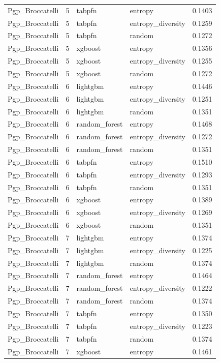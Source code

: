\begin{tabular}{lrllr}
Pgp_Broccatelli & 5 & tabpfn & entropy & 0.1403 \\
Pgp_Broccatelli & 5 & tabpfn & entropy_diversity & 0.1259 \\
Pgp_Broccatelli & 5 & tabpfn & random & 0.1272 \\
Pgp_Broccatelli & 5 & xgboost & entropy & 0.1356 \\
Pgp_Broccatelli & 5 & xgboost & entropy_diversity & 0.1255 \\
Pgp_Broccatelli & 5 & xgboost & random & 0.1272 \\
Pgp_Broccatelli & 6 & lightgbm & entropy & 0.1446 \\
Pgp_Broccatelli & 6 & lightgbm & entropy_diversity & 0.1251 \\
Pgp_Broccatelli & 6 & lightgbm & random & 0.1351 \\
Pgp_Broccatelli & 6 & random_forest & entropy & 0.1468 \\
Pgp_Broccatelli & 6 & random_forest & entropy_diversity & 0.1272 \\
Pgp_Broccatelli & 6 & random_forest & random & 0.1351 \\
Pgp_Broccatelli & 6 & tabpfn & entropy & 0.1510 \\
Pgp_Broccatelli & 6 & tabpfn & entropy_diversity & 0.1293 \\
Pgp_Broccatelli & 6 & tabpfn & random & 0.1351 \\
Pgp_Broccatelli & 6 & xgboost & entropy & 0.1389 \\
Pgp_Broccatelli & 6 & xgboost & entropy_diversity & 0.1269 \\
Pgp_Broccatelli & 6 & xgboost & random & 0.1351 \\
Pgp_Broccatelli & 7 & lightgbm & entropy & 0.1374 \\
Pgp_Broccatelli & 7 & lightgbm & entropy_diversity & 0.1225 \\
Pgp_Broccatelli & 7 & lightgbm & random & 0.1374 \\
Pgp_Broccatelli & 7 & random_forest & entropy & 0.1464 \\
Pgp_Broccatelli & 7 & random_forest & entropy_diversity & 0.1222 \\
Pgp_Broccatelli & 7 & random_forest & random & 0.1374 \\
Pgp_Broccatelli & 7 & tabpfn & entropy & 0.1350 \\
Pgp_Broccatelli & 7 & tabpfn & entropy_diversity & 0.1223 \\
Pgp_Broccatelli & 7 & tabpfn & random & 0.1374 \\
Pgp_Broccatelli & 7 & xgboost & entropy & 0.1461 \\

\end{tabular}
